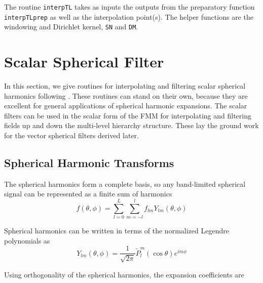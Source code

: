 The routine \texttt{interpTL} takes as inputs the outputs from the preparatory function \texttt{interpTLprep} as well as the interpolation point(s).  The helper functions are the windowing and Dirichlet kernel, \texttt{SN} and \texttt{DM}.  


{\footnotesize
{}
}

{\footnotesize
{}
}

{\footnotesize
{}
}

{\footnotesize
{}
}




\section{Scalar Spherical Filter}
\label{sec:scasphfilter}

In this section, we give routines for interpolating and filtering scalar spherical harmonics following \cite{yucel2008helmholtz}. These routines can stand on their own, because they are excellent for general applications of spherical harmonic expansions. The scalar filters can be used in the scalar form of the FMM for interpolating and filtering fields up and down the multi-level hierarchy structure. These lay the ground work for the vector spherical filters derived later.

\subsection{Spherical Harmonic Transforms}

The spherical harmonics form a complete basis, so any band-limited spherical signal can be represented as a finite sum of harmonics
\begin{equation}
f(\theta,\phi) = \sum_{l=0}^{L} \sum_{m = -l}^{l} f_{lm} Y_{lm}(\theta,\phi)
\label{c6eq1}
\end{equation}

Spherical harmonics can be written in terms of the normalized Legendre polynomials as 
\begin{equation}
Y_{lm}(\theta,\phi) = \dfrac{1}{\sqrt{2\pi}}\widetilde{P}_l^m(\cos \theta)e^{im\phi}
\end{equation}

Using orthogonality of the spherical harmonics, the expansion coefficients are

